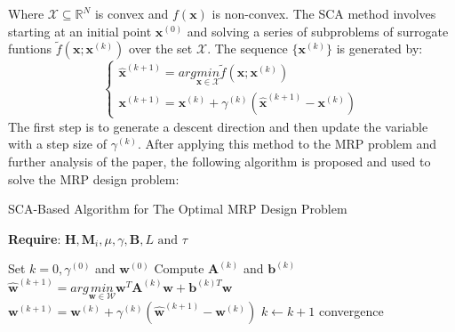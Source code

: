 \noindent Where $\mathcal{X} \subseteq \mathbb{R}^N$ is convex and $f(\mathbf{x})$ is non-convex. The SCA method involves starting at an initial point $\mathbf{x}^{(0)}$ and solving a series of subproblems of surrogate funtions $\tilde{f}(\mathbf{x}; \mathbf{x}^{(k)})$ over the set $\mathcal{X}$. The sequence $\bigl\{ \mathbf{x}^{(k)} \bigr\}$ is generated by: $$\begin{cases}
        \hat{\mathbf{x}}^{(k+1)} = arg \underset{\mathbf{x} \in \mathcal{X}}{min} \tilde{f}(\mathbf{x}; \mathbf{x}^{(k)}) \\
        \mathbf{x}^{(k+1)} = \mathbf{x}^{(k)} + \gamma^{(k)}(\hat{\mathbf{x}}^{(k+1)} - \mathbf{x}^{(k)})
    \end{cases}$$
The first step is to generate a descent direction and then update the variable with a step size of $\gamma^{(k)}$. After applying this method to the MRP problem and further analysis of the paper, the following algorithm is proposed and used to solve the MRP design problem:
\begin{algorithm}
    \caption{SCA-Based Algorithm for The Optimal MRP Design Problem}\label{alg:sca_alg}
    \textbf{Require}: $\mathbf{H}, \mathbf{M}_i, \mu, \gamma, \mathbf{B}, L \text{ and } \tau$
    \begin{algorithmic}[1]
        \State Set $k=0, \gamma^{(0)}$ and $\mathbf{w}^{(0)}$
        \Repeat
        \State Compute $\mathbf{A}^{(k)}$ and $\mathbf{b}^{(k)}$
        \State $\hat{\mathbf{w}}^{(k+1)} = arg \underset{\mathbf{w} \in \mathcal{W}}{min} \mathbf{w}^{T}\mathbf{A}^{(k)}\mathbf{w} + \mathbf{b}^{(k)T}\mathbf{w}$
        \State $\mathbf{w}^{(k+1)} = \mathbf{w}^{(k)} + \gamma^{(k)}(\hat{\mathbf{w}}^{(k+1)} - \mathbf{w}^{(k)})$
        \State $k \leftarrow k+1$
        \Until convergence
    \end{algorithmic}
\end{algorithm}

